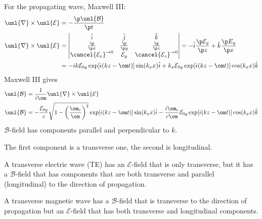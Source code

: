 \documentclass[a4paper, 11pt, normalem]{report}
\renewcommand\E{\mathcal{E}}
\newcommand\uE{\unl{\E}}
\renewcommand\B{\mathcal{B}}
\newcommand\uB{\unl{\B}}
\renewcommand\del{\unl{\nabla}}
\begin{document}
For the propagating wave, Maxwell \RN{3}:
\begin{align}
	\del \times \uE &= -\frac{\p\uB}{\p t} \\
	\del \times \uE &=
	\begin{vmatrix}
		\hat{i} & \hat{j} & \hat{k} \\
		\frac{\p}{\p x} & \frac{\p}{\p y} & \frac{\p}{\p z} \\
		\cancel{\E_x}^{\to 0} & \E_y & \cancel{\E_z}^{\to 0}
	\end{vmatrix}
	= -\hat{i}\frac{\p\E_y}{\p z} + \hat{k} \frac{\p E_y}{\p x} \\
	&= -ik\E_{0y}\exp[i(kz - \om t)]\sin(k_xx)\hat{i} + k_x\E_{0y}\exp[i(kz - \om t)]\cos(k_xx)\hat{k}
\end{align}
Maxwell \RN{3} gives
\begin{align}
	\uB &= \frac{1}{i\om}\del\times\uE \\
	\uB &= -\frac{\E_{0y}}{c}\sqrt{1 - \left(\frac{\om_c}{\om}\right)^2}\exp[i(kz - \om t)]\sin(k_xx)\hat{i} - \frac{i\om_c}{c\om}\E_{0y}\exp[i(kz - \om t)]\cos(k_xx)\hat{k}
\end{align}
$\B$-field has components parallel and perpendicular to $k$.

The first component is a transverse one, the second is longitudinal.

A transverse electric wave (TE) has an $\E$-field that is only transverse, but it has a $\B$-field that has components that are both transverse and parallel (longitudinal) to the direction of propagation.

A transverse magnetic wave has a $\B$-field that is transverse to the direction of propagation but an $\E$-field that has both transverse and longitudinal components.
\end{document}

